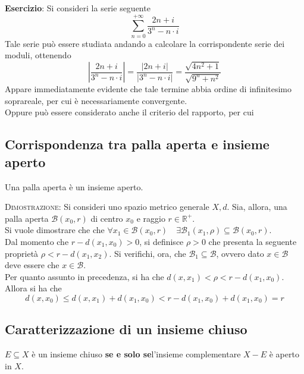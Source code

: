 \documentclass[a4paper]{extarticle}
\begin{document}
\vspace{1em}
\noindent
\textbf{Esercizio}: Si consideri la serie seguente
\[\sum_{n=0}^{+\infty} \frac{2n+i}{3^n-n \cdot i}\]
Tale serie può essere studiata andando a calcolare la corrispondente serie dei moduli, ottenendo
\[\left \vert \frac{2n+i}{3^n-n \cdot i} \right \vert = \frac{\vert 2n+i \vert}{\vert 3^n-n \cdot i \vert} = \frac{\sqrt{4n^2+1}}{\sqrt{9^n+n^2}}\]
Appare immediatamente evidente che tale termine abbia ordine di infinitesimo soprareale, per cui è necessariamente convergente.\\
Oppure può essere considerato anche il criterio del rapporto, per cui

\vspace{1em}
\noindent
\subsection{Corrispondenza tra palla aperta e insieme aperto}
Una palla aperta è un insieme aperto.

\vspace{2em}
\noindent
\normalfont \normalsize
\textsc{Dimostrazione}: Si consideri uno spazio metrico generale $X,d$. Sia, allora, una palla aperta $\mathcal{B}(x_0,r)$ di centro $x_0$ e raggio $r \in \mathbb{R}^+$.\\
Si vuole dimostrare che che $\forall x_1 \in \mathcal{B}(x_0,r) \hspace{1em} \exists \mathcal{B}_1(x_1,\rho) \subseteq \mathcal{B}(x_0,r)$.\\
Dal momento che $r-d(x_1,x_0) > 0$, si definisce $\rho > 0$ che presenta la seguente proprietà $\rho < r - d(x_1,x_2)$. Si verifichi, ora, che $\mathcal{B}_1 \subseteq \mathcal{B}$, ovvero dato $x \in \mathcal{B}$ deve essere che $x \in \mathcal{B}$.\\
Per quanto assunto in precedenza, si ha che $d(x,x_1) < \rho < r-d(x_1,x_0)$. Allora si ha che
\[d(x,x_0) \leq d(x,x_1) + d(x_1,x_0) < r - d(x_1,x_0)+d(x_1,x_0) = r\]

\vspace{1em}
\subsection{Caratterizzazione di un insieme chiuso}
$E \subseteq X$ è un insieme chiuso \textbf{se e solo se}l'insieme complementare $X-E$ è aperto in $X$.
\end{document}

